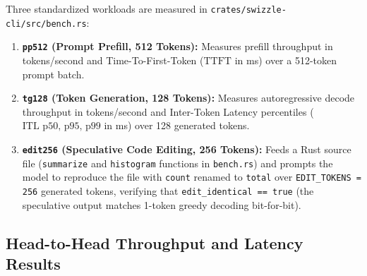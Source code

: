 \documentclass[10pt,a4paper]{article}
\theoremstyle{swzstyle}
\newcommand{\code}[1]{\texttt{#1}}
\begin{document}
Three standardized workloads are measured in \code{crates/swizzle-cli/src/bench.rs}:
\begin{enumerate}
  \item \textbf{\texttt{pp512} (Prompt Prefill, 512 Tokens):} Measures prefill throughput in tokens/second and Time-To-First-Token ($\text{TTFT}$ in ms) over a 512-token prompt batch.
  \item \textbf{\texttt{tg128} (Token Generation, 128 Tokens):} Measures autoregressive decode throughput in tokens/second and Inter-Token Latency percentiles ($\text{ITL p50, p95, p99}$ in ms) over 128 generated tokens.
  \item \textbf{\texttt{edit256} (Speculative Code Editing, 256 Tokens):} Feeds a Rust source file (\code{summarize} and \code{histogram} functions in \code{bench.rs}) and prompts the model to reproduce the file with \code{count} renamed to \code{total} over \code{EDIT\_TOKENS = 256} generated tokens, verifying that \code{edit\_identical == true} (the speculative output matches 1-token greedy decoding bit-for-bit).
\end{enumerate}

\subsection{Head-to-Head Throughput and Latency Results}
\end{document}
